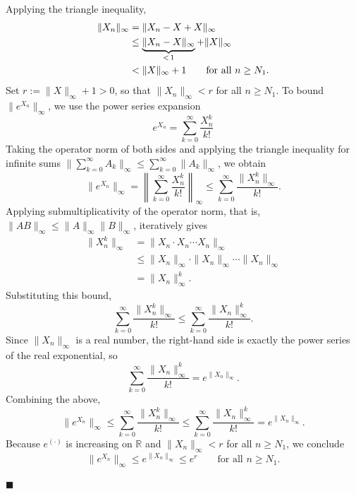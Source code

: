 \documentclass[10pt,a4paper]{amsart}
\renewenvironment{proof}{\noindent{\bfseries Proof.}}{\hfill$\blacksquare$}
\begin{document}
\begin{proof}
Applying the triangle inequality,
\begin{align}
    \|X_n\|_{\infty} 
    &= \|X_n - X + X\|_{\infty} \notag\\ 
    &\le \underbrace{\|X_n - X\|_{\infty}}_{<\, 1} + \|X\|_{\infty} \notag\\
    &< \|X\|_{\infty} + 1
    \qquad \text{for all } n\ge N_1.
\end{align}
Set $r := \|X\|_{\infty}+1 > 0$, so that $\|X_n\|_{\infty} < r$ for all $n \ge N_1$.
To bound $\|e^{X_n}\|_\infty$, we use the power series expansion
\begin{equation}
    e^{X_n} = \sum_{k=0}^{\infty} \frac{X_n^k}{k!} 
\end{equation}
Taking the operator norm of both sides and applying the triangle inequality for 
infinite sums $\bigl\|\sum_{k=0}^{\infty} A_k\bigr\|_\infty \le \sum_{k=0}^{\infty} 
\|A_k\|_\infty$, we obtain
\begin{equation}
    \|e^{X_n}\|_{\infty} 
    = \left\|\sum_{k=0}^{\infty} \frac{X_n^k}{k!}\right\|_\infty
    \le \sum_{k=0}^{\infty} \frac{\|X_n^k\|_{\infty}}{k!}.
\end{equation}
Applying submultiplicativity of the operator norm, that is, 
$\|AB\|_\infty \le \|A\|_\infty\|B\|_\infty$, iteratively gives
\begin{equation}
\begin{aligned}
    \|X_n^k\|_\infty 
    &= \|X_n \cdot X_n \cdots X_n\|_\infty \\
    &\le \|X_n\|_\infty \cdot \|X_n\|_\infty \cdots \|X_n\|_\infty \\
    &= \|X_n\|_\infty^k.
\end{aligned}
\end{equation}
Substituting this bound,
\begin{equation}
    \sum_{k=0}^{\infty} \frac{\|X_n^k\|_{\infty}}{k!} 
    \le \sum_{k=0}^{\infty} \frac{\|X_n\|_{\infty}^k}{k!}.
\end{equation}
Since $\|X_n\|_\infty$ is a real number, the right-hand side is exactly the 
power series of the real exponential, so
\begin{equation}
    \sum_{k=0}^{\infty} \frac{\|X_n\|_{\infty}^k}{k!} = e^{\|X_n\|_{\infty}}.
\end{equation}
Combining the above,
\begin{equation}
    \|e^{X_n}\|_{\infty} \le \sum_{k=0}^{\infty} \frac{\|X_n^k\|_\infty}{k!}
    \le \sum_{k=0}^{\infty} \frac{\|X_n\|_{\infty}^k}{k!} 
    = e^{\|X_n\|_{\infty}}.
\end{equation}
Because $e^{(\cdot)}$ is increasing on $\mathbb{R}$ and $\|X_n\|_\infty < r$ 
for all $n \ge N_1$, we conclude
\begin{equation}
    \|e^{X_n}\|_{\infty} \le e^{\|X_n\|_{\infty}} \le e^{r}
    \qquad \text{for all } n\ge N_1.
\end{equation}


\end{proof}
\end{document}
